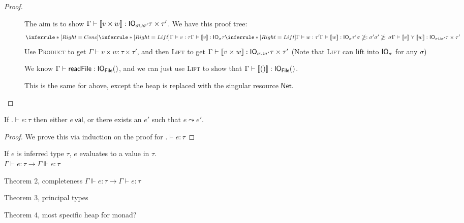 \begin{proof}
\begin{description}
  \item[]
    The aim is to show $\Gamma \vdash [\![ v \times w]\!] : \mathsf{IO}_{\sigma \cup \sigma'} \tau \times \tau'$.
    We have this proof tree:
    $$\inferrule*[Right=Conc]{
      \inferrule*[Right=Lift]{\Gamma \vdash v : \tau}{\Gamma \vdash \lift{v} : \IO_\sigma \tau} \\
      \inferrule*[Right=Lift]{\Gamma \vdash w : \tau'}{\Gamma \vdash \lift{w} : \IO_\sigma \tau'}
      \\
      \sigma \notsubtyp \sigma' \\ \sigma' \notsubtyp \sigma}
    {\Gamma \vdash \lift{v} \curlyvee \lift{w} : \IO_{\sigma \cup \sigma'} \tau \times \tau'}$$
    Use \textsc{Product} to get $\Gamma \vdash v \times w : \tau \times \tau'$, and then
    \textsc{Lift} to get $\Gamma \vdash [\![ v \times w]\!] : \mathsf{IO}_{\sigma \cup \sigma'} \tau \times \tau'$
    (Note that \textsc{Lift} can lift into $\mathsf{IO}_\sigma$ for any $\sigma$)

  \item[\textmd{}]
    We know $\Gamma \vdash
    \textsf{readFile} : \mathsf{IO}_{\textsf{File}} ()$, and we can just use
    \textsc{Lift} to show that $\Gamma \vdash [\![()]\!] : \mathsf{IO}_{\textsf{File}}
    ()$.
  \item[\textmd{}]
    This is the same for above, except the heap is replaced with the
    singular resource $\textsf{Net}$.
  \end{description}
\end{proof}

\begin{theorem}[Progress]
  If $. \vdash e : \tau$ then either $e \ \textsf{val}$, or there exists an $e'$
  such that $e \leadsto e'$.
\end{theorem}

\begin{proof}
  We prove this via induction on the proof for $. \vdash e : \tau$
\end{proof}


\begin{theorem}[Soundness]
  If $e$ is inferred type $\tau$, $e$ evaluates to a value in $\tau$. \\
  $\Gamma \vdash e : \tau \rightarrow \Gamma \Vdash e : \tau$
\end{theorem}


Theorem 2, completeness $\Gamma \Vdash e : \tau \rightarrow \Gamma \vdash e : \tau$

Theorem 3, principal types

Theorem 4, most specific heap for monad?
